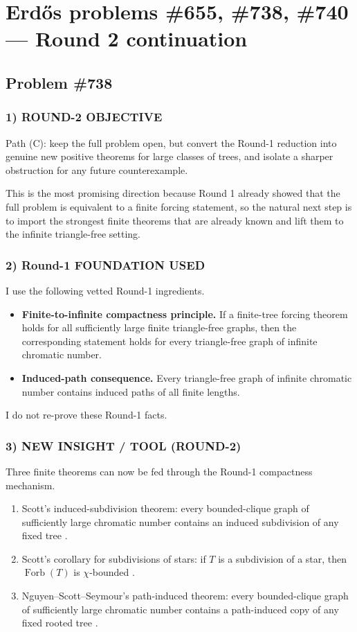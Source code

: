 \section{Erd\H{o}s problems \#655, \#738, \#740 --- Round 2 continuation}

\subsection*{Problem \#738}

\subsubsection*{1) ROUND-2 OBJECTIVE}
Path (C): keep the full problem open, but convert the Round-1 reduction into genuine new positive theorems for large classes of trees, and isolate a sharper obstruction for any future counterexample.

This is the most promising direction because Round 1 already showed that the full problem is equivalent to a finite forcing statement, so the natural next step is to import the strongest finite theorems that are already known and lift them to the infinite triangle-free setting.

\subsubsection*{2) Round-1 FOUNDATION USED}
I use the following vetted Round-1 ingredients.

\begin{itemize}
\item \textbf{Finite-to-infinite compactness principle.} If a finite-tree forcing theorem holds for all sufficiently large finite triangle-free graphs, then the corresponding statement holds for every triangle-free graph of infinite chromatic number.
\item \textbf{Induced-path consequence.} Every triangle-free graph of infinite chromatic number contains induced paths of all finite lengths.
\end{itemize}

I do not re-prove these Round-1 facts.

\subsubsection*{3) NEW INSIGHT / TOOL (ROUND-2)}
Three finite theorems can now be fed through the Round-1 compactness mechanism.

\begin{enumerate}
\item Scott's induced-subdivision theorem: every bounded-clique graph of sufficiently large chromatic number contains an induced subdivision of any fixed tree \cite{Scott97}.
\item Scott's corollary for subdivisions of stars: if $T$ is a subdivision of a star, then $\operatorname{Forb}(T)$ is $\chi$-bounded \cite{Scott97}.
\item Nguyen--Scott--Seymour's path-induced theorem: every bounded-clique graph of sufficiently large chromatic number contains a path-induced copy of any fixed rooted tree \cite{NguyenScottSeymour24}.
\end{enumerate}

